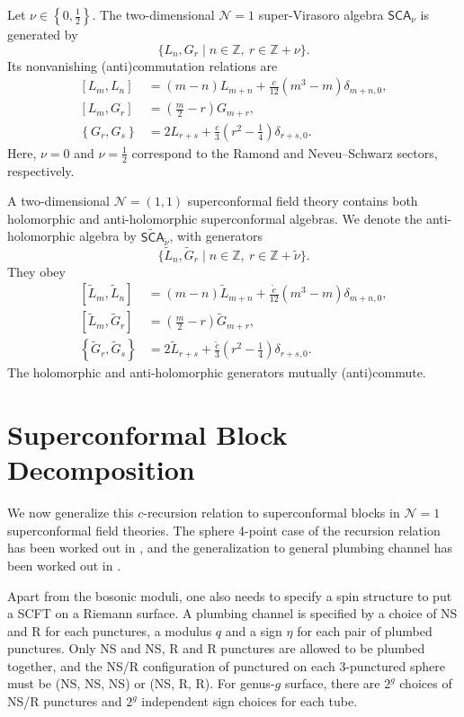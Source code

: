 \documentclass[12pt]{article}
\newcommand{\ie}{\begin{equation}\begin{aligned}}
\newcommand{\fe}{\end{aligned}\end{equation}}
\numberwithin{equation}{section}
\begin{document}
Let \(\nu\in\left\{0,\frac12\right\}\). The two-dimensional \(\mathcal N=1\) super-Virasoro algebra \(\mathsf{SCA}_\nu\) is generated by
\[
\{L_n,G_r\mid n\in\mathbb Z,\ r\in\mathbb Z+\nu\}.
\]
Its nonvanishing (anti)commutation relations are
\ie
\left[L_m,L_n\right]
&=(m-n)L_{m+n}
+\frac{c}{12}\left(m^3-m\right)\delta_{m+n,0},\\
\left[L_m,G_r\right]
&=\left(\frac{m}{2}-r\right)G_{m+r},\\
\left\{G_r,G_s\right\}
&=2L_{r+s}
+\frac{c}{3}\left(r^2-\frac14\right)\delta_{r+s,0}.
\fe
Here, \(\nu=0\) and \(\nu=\frac12\) correspond to the Ramond and Neveu–Schwarz sectors, respectively.

A two-dimensional \(\mathcal N=(1,1)\) superconformal field theory contains both holomorphic and anti-holomorphic superconformal algebras. We denote the anti-holomorphic algebra by \(\widetilde{\mathsf{SCA}}_{\tilde\nu}\), with generators
\[
\{\widetilde L_n,\widetilde G_r\mid n\in\mathbb Z,\ r\in\mathbb Z+\tilde\nu\}.
\]
They obey
\ie
\left[\widetilde L_m,\widetilde L_n\right]
&=(m-n)\widetilde L_{m+n}
+\frac{\widetilde c}{12}\left(m^3-m\right)\delta_{m+n,0},\\
\left[\widetilde L_m,\widetilde G_r\right]
&=\left(\frac{m}{2}-r\right)\widetilde G_{m+r},\\
\left\{\widetilde G_r,\widetilde G_s\right\}
&=2\widetilde L_{r+s}
+\frac{\widetilde c}{3}\left(r^2-\frac14\right)\delta_{r+s,0}.
\fe
The holomorphic and anti-holomorphic generators mutually (anti)commute.


\section{Superconformal Block Decomposition}

We now generalize this $c$-recursion relation to superconformal blocks in $\mathcal{N}=1$ superconformal field theories. The sphere 4-point case of the recursion relation has been worked out in \cite{0611266, 0611295}, and the generalization to general plumbing channel has been worked out in \cite{1806.09563}.

Apart from the bosonic moduli, one also needs to specify a spin structure to put a SCFT on a Riemann surface. A plumbing channel is specified by a choice of NS and R for each punctures, a modulus $q$ and a sign $\eta$ for each pair of plumbed punctures. Only NS and NS, R and R punctures are allowed to be plumbed together, and the NS/R configuration of punctured on each 3-punctured sphere must be (NS, NS, NS) or (NS, R, R). For genus-$g$ surface, there are $2^g$ choices of NS/R punctures and $2^g$ independent sign choices for each tube.
\end{document}
